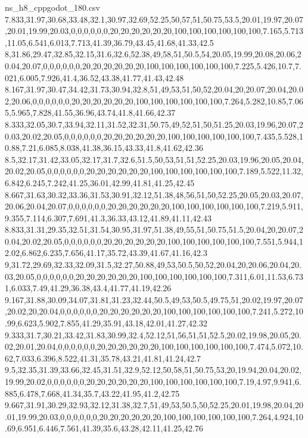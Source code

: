 \begin{filecontents*}[overwrite]{ns_h8_cppgodot_180.csv}
7.833,31.97,30.68,33.48,32.1,30.97,32.69,52.25,50,57,51,50.75,53.5,20.01,19.97,20.07,20.01,19.99,20.03,0,0,0,0,0,0,20,20,20,20,20,20,100,100,100,100,100,100,7.165,5.713,11.05,6.541,6.013,7.713,41.39,36.79,43.45,41.68,41.33,42.5
8,31.86,29.47,32.85,32.15,31.6,32.6,52.38,49,58,51,50.5,54,20.05,19.99,20.08,20.06,20.04,20.07,0,0,0,0,0,0,20,20,20,20,20,20,100,100,100,100,100,100,7.225,5.426,10.7,7.021,6.005,7.926,41.4,36.52,43.38,41.77,41.43,42.48
8.167,31.97,30.47,34.42,31.73,30.94,32.8,51,49,53,51,50,52,20.04,20,20.07,20.04,20.02,20.06,0,0,0,0,0,0,20,20,20,20,20,20,100,100,100,100,100,100,7.264,5.282,10.85,7.065,5.965,7.828,41.55,36.96,43.74,41.8,41.66,42.37
8.333,32.05,30.7,33.94,32.11,31.52,32.31,50.75,49,52,51,50,51.25,20.03,19.96,20.07,20.03,20.02,20.05,0,0,0,0,0,0,20,20,20,20,20,20,100,100,100,100,100,100,7.435,5.528,10.88,7.21,6.085,8.038,41.38,36.15,43.33,41.8,41.62,42.36
8.5,32.17,31.42,33.05,32.17,31.7,32.6,51.5,50,53,51,51,52.25,20.03,19.96,20.05,20.04,20.02,20.05,0,0,0,0,0,0,20,20,20,20,20,20,100,100,100,100,100,100,7.189,5.522,11.32,6.842,6.245,7.242,41.25,36.01,42.99,41.81,41.25,42.45
8.667,31.63,30.32,33.36,31.53,30.91,32.12,51.38,48,56,51,50,52.25,20.05,20.03,20.07,20.06,20.04,20.07,0,0,0,0,0,0,20,20,20,20,20,20,100,100,100,100,100,100,7.219,5.911,9.355,7.114,6.307,7.691,41.3,36.33,43.12,41.89,41.11,42.43
8.833,31.31,29.35,32.51,31.54,30.95,31.97,51.38,49,55,51,50.75,51.5,20.04,20,20.07,20.04,20.02,20.05,0,0,0,0,0,0,20,20,20,20,20,20,100,100,100,100,100,100,7.551,5.944,12.02,6.862,6.235,7.656,41.17,35.72,43.39,41.67,41.16,42.3
9,31.72,29.69,32.33,32.09,31.5,32.27,50.88,49,53,50.5,50,52,20.04,20,20.06,20.04,20.03,20.05,0,0,0,0,0,0,20,20,20,20,20,20,100,100,100,100,100,100,7.311,6.01,11.53,6.731,6.033,7.49,41.29,36.38,43.4,41.77,41.19,42.26
9.167,31.88,30.09,34.07,31.81,31.23,32.44,50.5,49,53,50.5,49.75,51,20.02,19.97,20.07,20.02,20,20.04,0,0,0,0,0,0,20,20,20,20,20,20,100,100,100,100,100,100,7.241,5.272,10.99,6.623,5.902,7.855,41.29,35.91,43.18,42.01,41.27,42.32
9.333,31.7,30.21,33.42,31.83,30.99,32.4,52.12,51,56,51,51,52.5,20.02,19.98,20.05,20.02,20.01,20.04,0,0,0,0,0,0,20,20,20,20,20,20,100,100,100,100,100,100,7.474,5.072,10.62,7.033,6.396,8.522,41.31,35.78,43.21,41.81,41.24,42.7
9.5,32.35,31.39,33.66,32.45,31.51,32.9,52.12,50,58,51,50.75,53,20,19.94,20.04,20.02,19.99,20.02,0,0,0,0,0,0,20,20,20,20,20,20,100,100,100,100,100,100,7.19,4.97,9.941,6.885,6.478,7.668,41.34,35.7,43.22,41.95,41.2,42.75
9.667,31.91,30.29,32.93,32.12,31.38,32.7,51,49,53,50.5,50,52.25,20.01,19.98,20.04,20.01,19.99,20.03,0,0,0,0,0,0,20,20,20,20,20,20,100,100,100,100,100,100,7.264,4.924,10.69,6.951,6.446,7.561,41.39,35.6,43.28,42.11,41.25,42.76

\end{filecontents*}
